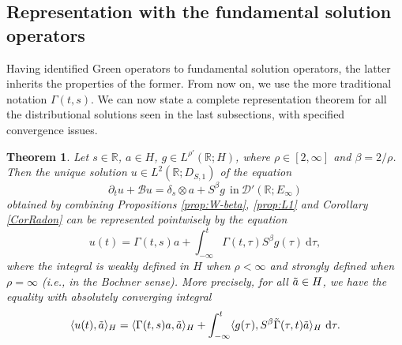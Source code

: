 \documentclass[11pt, letterpaper]{amsart}
\newtheorem{thm}{Theorem}[section]
\theoremstyle{definition}
\theoremstyle{remark}
\numberwithin{equation}{section}
\begin{document}
\subsection{Representation with the fundamental solution operators} Having identified Green operators to fundamental solution operators, the latter inherits the properties of the former. From now on, we use the more traditional notation $\Gamma(t,s)$. We can now state a complete representation theorem
for all the distributional solutions seen in the last subsections, with specified convergence issues.


\begin{thm}\label{ThmGreenReprese}
Let $s\in \mathbb{R}$, $a \in H$, $g \in L^{\rho'}(\mathbb{R};H)$, where $\rho \in [2,\infty]$ and $\beta={2}/{\rho}$. Then the unique solution $u \in L^2(\mathbb{R};D_{S,1})$ of the equation 
    \begin{equation*}
        \partial_t u +\mathcal{B}u= \delta_s \otimes a + S^\beta g  \ \ \mathrm{in} \ \mathcal{D}'(\mathbb{R};E_\infty)
    \end{equation*}
obtained by  combining Propositions  \ref{prop:W-beta}, \ref{prop:L1} and Corollary \ref{CorRadon} can be represented pointwisely by the equation 
    \begin{equation*}
        u(t) = \Gamma(t,s)a 
        + \int_{-\infty}^{t} \Gamma(t,\tau) S^\beta g(\tau)\ \mathrm d \tau,
    \end{equation*}
    where the integral is weakly defined in $H$ when $\rho<\infty$ and strongly defined when $\rho=\infty$ (i.e.,  in the Bochner sense). More precisely, for all $\Tilde{a}\in H$, we have the equality with absolutely converging integral
    \begin{equation}\label{WeaksensGreen}
        \langle u(t), \Tilde{a} \rangle_H = \langle \Gamma(t,s)a, \Tilde{a} \rangle_H 
        + \int_{-\infty}^{t} \langle  g(\tau),S^\beta\Tilde{\Gamma}(\tau,t) \Tilde{a} \rangle_{H} \ \mathrm d \tau.
    \end{equation}
    
\end{thm}
\end{document}
